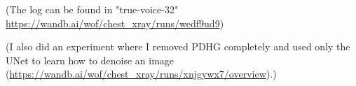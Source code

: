 \documentclass[12pt]{article}
\begin{document}





(The log can be found in 
"true-voice-32" \url{https://wandb.ai/wof/chest_xray/runs/wedf9ud9})





    





(I also did an experiment where I removed PDHG completely and used only the UNet to learn how to denoise an image (\url{https://wandb.ai/wof/chest_xray/runs/xnjgywx7/overview}).)


\end{document}
